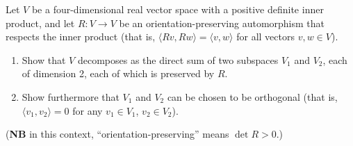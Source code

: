 \begin{question}[subtitle = August 2023 Problem 3,ID=Aug23_3]
Let $V$ be a four-dimensional real vector space with a positive definite inner product, and let $R\colon V \to V$ be an orientation-preserving automorphism that respects the inner product (that is, $\langle Rv, Rw \rangle = \langle v, w \rangle$ for all vectors $v,w \in V$).
\begin{enumerate}
    \item Show that $V$ decomposes as the direct sum of two subspaces $V_1$ and $V_2$, each of dimension 2, each of which is preserved by $R$.
    \item Show furthermore that $V_1$ and $V_2$ can be chosen to be orthogonal (that is, $\langle v_1, v_2 \rangle = 0$ for any $v_1 \in V_1$, $v_2 \in V_2$).
\end{enumerate}

(\textbf{NB} in this context, ``orientation-preserving'' means $\det R > 0$.)
\end{question}
